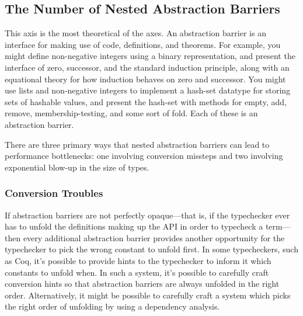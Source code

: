 
\subsection{The Number of Nested Abstraction Barriers} \label{sec:axis-nested-abstraction-barriers}


This axis is the most theoretical of the axes.
An abstraction barrier is an interface for making use of code, definitions, and theorems.
For example, you might define non-negative integers using a binary representation, and present the interface of zero, successor, and the standard induction principle, along with an equational theory for how induction behaves on zero and successor.
You might use lists and non-negative integers to implement a hash-set datatype for storing sets of hashable values, and present the hash-set with methods for empty, add, remove, membership-testing, and some sort of fold.
Each of these is an abstraction barrier.

There are three primary ways that nested abstraction barriers can lead to performance bottlenecks: one involving conversion missteps and two involving exponential blow-up in the size of types.

\subsubsection{Conversion Troubles} \label{sec:abstraction-barriers:conversion-troubles}
If abstraction barriers are not perfectly opaque---that is, if the typechecker ever has to unfold the definitions making up the API in order to typecheck a term---then every additional abstraction barrier provides another opportunity for the typechecker to pick the wrong constant to unfold first.
In some typecheckers, such as Coq, it's possible to provide hints to the typechecker to inform it which constants to unfold when.
In such a system, it's possible to carefully craft conversion hints so that abstraction barriers are always unfolded in the right order.
Alternatively, it might be possible to carefully craft a system which picks the right order of unfolding by using a dependency analysis.

